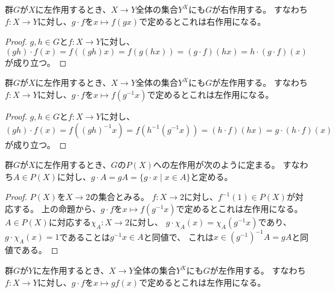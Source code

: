 \begin{proposition}
    \label{left-function-right-action}
    群$G$が$X$に左作用するとき、$X \to Y$全体の集合$Y^X$にも$G$が右作用する。
    すなわち$f:X\to Y$に対し、$g\cdot f$を$x\mapsto f(gx)$で定めるとこれは右作用になる。
\end{proposition}

\begin{proof}
    $g, h\in G$と$f:X\to Y$に対し、
    $(gh)\cdot f(x)=f((gh)x)=f(g(hx))=(g\cdot f)(hx)=h\cdot(g\cdot f)(x)$が成り立つ。
\end{proof}

\begin{proposition}
    \label{left-function-left-action}
    \leanok
    群$G$が$X$に左作用するとき、$X \to Y$全体の集合$Y^X$にも$G$が左作用する。
    すなわち$f:X\to Y$に対し、$g\cdot f$を$x\mapsto f(g^{-1}x)$で定めるとこれは左作用になる。
\end{proposition}

\begin{proof}
    $g, h\in G$と$f:X\to Y$に対し、
    $(gh)\cdot f(x)=f((gh)^{-1}x)=f(h^{-1}(g^{-1}x))=(h\cdot f)(hx)=g\cdot(h\cdot f)(x)$が成り立つ。
\end{proof}

\begin{proposition}
    \label{powerset-action}
    群$G$が$X$に左作用するとき、$G$の$P(X)$への左作用が次のように定まる。
    すなわち$A\in P(X)$に対し、$g\cdot A=gA=\{g\cdot x\mid x\in A\}$と定める。
\end{proposition}

\begin{proof}
    $P(X)$を$X \to 2$の集合とみる。
    $f:X\to 2$に対し、$f^{-1}(1)\in P(X)$が対応する。
    上の命題から、$g\cdot f$を$x\mapsto f(g^{-1}x)$で定めるとこれは左作用になる。
    $A\in P(X)$に対応する$\chi_A:X\to 2$に対し、
    $g\cdot \chi_A(x)=\chi_A(g^{-1}x)$であり、
    $g\cdot\chi_A(x)=1$であることは$g^{-1}x\in A$と同値で、
    これは$x\in (g^{-1})^{-1}A=gA$と同値である。
\end{proof}

\begin{proposition}
    \label{left-function-left-action2}
    群$G$が$Y$に左作用するとき、$X \to Y$全体の集合$Y^X$にも$G$が左作用する。
    すなわち$f:X\to Y$に対し、$g\cdot f$を$x\mapsto gf(x)$で定めるとこれは左作用になる。
\end{proposition}

